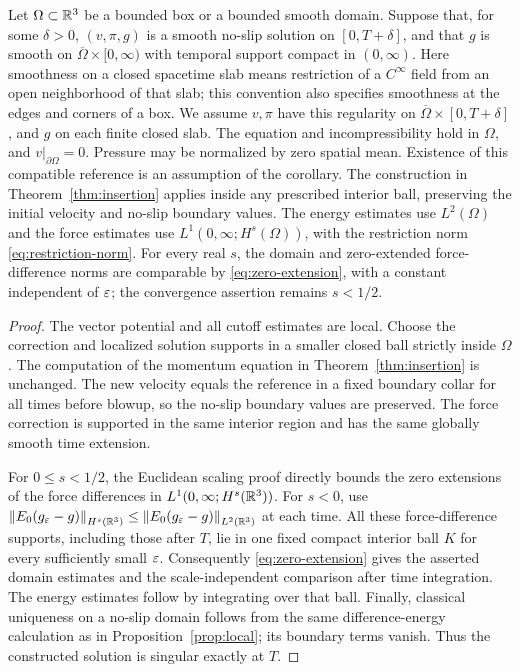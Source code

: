 \begin{corollary}\label{cor:boundary}
Let $\Omega\subset\mathbb R^3$ be a bounded box or a bounded smooth domain.
Suppose that, for some $\delta>0$, $(v,\pi,g)$ is a smooth no-slip
solution on $[0,T+\delta]$, and that $g$ is smooth on
$\overline\Omega\times[0,\infty)$ with temporal support compact in
$(0,\infty)$.
Here smoothness on a closed spacetime slab means restriction of a
$C^\infty$ field from an open neighborhood of that slab; this convention
also specifies smoothness at the edges and corners of a box. We assume
$v,\pi$ have this regularity on
$\overline\Omega\times[0,T+\delta]$, and $g$ on each finite closed slab.
The equation and incompressibility hold in $\Omega$, and
$v|_{\partial\Omega}=0$. Pressure may be normalized by zero spatial mean.
Existence of this compatible reference is an assumption of the corollary.
The construction in Theorem~\ref{thm:insertion} applies inside any prescribed interior ball, preserving the initial velocity and no-slip boundary values.
The energy estimates use $L^2(\Omega)$ and the force estimates use
$L^1(0,\infty;H^s(\Omega))$, with the restriction norm
\eqref{eq:restriction-norm}. For every real $s$, the domain and zero-extended
force-difference norms are comparable by \eqref{eq:zero-extension}, with a
constant independent of $\varepsilon$; the convergence assertion remains $s<1/2$.
\end{corollary}
\begin{proof}
The vector potential and all cutoff estimates are local. Choose the correction and localized solution supports in a smaller closed ball strictly inside $\Omega$.
The computation of the momentum equation in Theorem~\ref{thm:insertion} is unchanged. The new velocity equals the reference in a fixed boundary collar for all times before blowup, so the no-slip boundary values are preserved. The force correction is supported in the same interior region and has the same globally smooth time extension.

For $0\le s<1/2$, the Euclidean scaling proof directly bounds the zero
extensions of the force differences in $L^1(0,\infty;H^s(\mathbb R^3))$.
For $s<0$, use $\left\lVert E_0(g_\varepsilon-g)\right\rVert_{H^s(\mathbb R^3)}
\le\left\lVert E_0(g_\varepsilon-g)\right\rVert_{L^2(\mathbb R^3)}$ at each time.
All these force-difference supports, including those after $T$, lie in one
fixed compact interior ball $K$ for every sufficiently small $\varepsilon$.
Consequently \eqref{eq:zero-extension} gives the asserted domain estimates
and the scale-independent comparison after time integration. The energy estimates follow by integrating over that ball. Finally, classical uniqueness on a no-slip domain follows from the same difference-energy calculation as in Proposition~\ref{prop:local}; its boundary terms vanish. Thus the constructed solution is singular exactly at $T$.
\end{proof}

